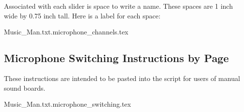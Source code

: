 \documentclass[letterpaper]{article}
\begin{document}
Associated with each slider is space to write a name.  
These spaces are 1 inch wide by 0.75 inch tall.  
Here is a label for each space:

{\Large
 {Music_Man.txt.microphone_channels.tex}
}

\subsection {Microphone Switching Instructions by Page}

These instructions are intended to be pasted into the script
for users of manual sound boards.

 {Music_Man.txt.microphone_switching.tex}
\end{document}
